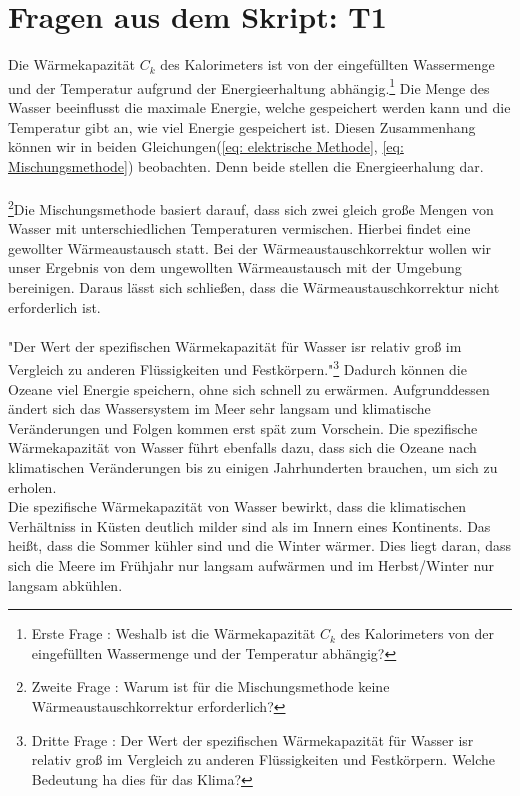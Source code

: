 \documentclass[bibliography=totocnumbered]{scrartcl}
\begin{document}
	\section{Fragen aus dem Skript: T1 }
	Die Wärmekapazität $ C_{k} $ des Kalorimeters ist von der eingefüllten Wassermenge und der Temperatur aufgrund der Energieerhaltung abhängig.\footnote{Erste Frage \smartcite[vgl.][77]{Muller.c}: Weshalb ist die Wärmekapazität $ C_{k} $ des Kalorimeters von der eingefüllten Wassermenge und der Temperatur abhängig?} Die Menge des Wasser beeinflusst die maximale Energie, welche gespeichert werden kann und die Temperatur gibt an, wie viel Energie gespeichert ist. Diesen Zusammenhang können wir in beiden Gleichungen(\ref{eq: elektrische Methode}, \ref{eq: Mischungsmethode}) beobachten. Denn beide stellen die Energieerhalung dar.\\\\
	\footnote{Zweite Frage \smartcite[vgl.][77]{Muller.c}: Warum ist für die Mischungsmethode keine Wärmeaustauschkorrektur erforderlich?}Die Mischungsmethode basiert darauf, dass sich zwei gleich große Mengen von Wasser mit unterschiedlichen Temperaturen vermischen. Hierbei findet eine gewollter Wärmeaustausch statt. Bei der Wärmeaustauschkorrektur wollen wir unser Ergebnis von dem ungewollten Wärmeaustausch mit der Umgebung bereinigen. Daraus lässt sich schließen, dass die Wärmeaustauschkorrektur nicht erforderlich ist.\\\\
	"Der Wert der spezifischen Wärmekapazität für Wasser isr relativ groß im Vergleich zu anderen Flüssigkeiten und Festkörpern."\smartcite[vgl.][77]{Muller.c}\footnote{Dritte Frage  \smartcite[vgl.][77]{Muller.c}: Der Wert der spezifischen Wärmekapazität für Wasser isr relativ groß im Vergleich zu anderen Flüssigkeiten und Festkörpern. Welche Bedeutung ha dies für das Klima?} Dadurch können die Ozeane viel Energie speichern, ohne sich schnell zu erwärmen. Aufgrunddessen ändert sich das Wassersystem im Meer sehr langsam und klimatische Veränderungen und Folgen kommen erst spät zum Vorschein. Die spezifische Wärmekapazität von Wasser führt ebenfalls dazu, dass sich die Ozeane nach klimatischen Veränderungen bis zu einigen Jahrhunderten brauchen, um sich zu erholen.\smartcite{Eig_Wasser_21} \\
	Die spezifische Wärmekapazität von Wasser bewirkt, dass die klimatischen Verhältniss in Küsten deutlich milder sind als im Innern eines Kontinents. Das heißt, dass die Sommer kühler sind und die Winter wärmer. Dies liegt daran, dass sich die Meere im Frühjahr nur langsam aufwärmen und im Herbst/Winter nur langsam abkühlen.\smartcite{Eig_Wasser_21}
	
	
	\newpage
	\appendix
	\printbibliography[title={Quellenverzeichnis}]
	
	
\end{document}
